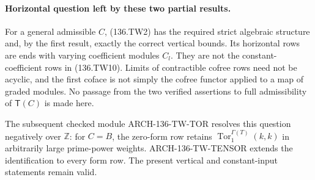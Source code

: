 \paragraph{Horizontal question left by these two partial results.}
For a general admissible $C$, (136.TW2) has the required
strict algebraic structure and, by the first result,
exactly the correct vertical bounds. Its horizontal
rows are ends with varying coefficient modules $C_l$.
They are not the constant-coefficient rows in
(136.TW10). Limits of contractible cofree rows need
not be acyclic, and the first coface is not simply
the cofree functor applied to a map of graded modules.
No passage from the two verified assertions to full
admissibility of $\mathsf T(C)$ is made here.

The subsequent checked module ARCH-136-TW-TOR resolves
this question negatively over $\mathbb Z$: for $C=B$,
the zero-form row retains $\operatorname{Tor}_1^{\Gamma(T)}(k,k)$
in arbitrarily large prime-power weights.
ARCH-136-TW-TENSOR extends the identification to every
form row. The present vertical and constant-input
statements remain valid.
